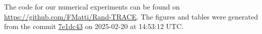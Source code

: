The code for our numerical experiments can be found on \url{https://github.com/FMatti/Rand-TRACE}. The figures and tables were generated from the commit \href{https://github.com/FMatti/Rand-TRACE/tree/7e1dc43}{7e1dc43} on 2025-02-20 at 14:53:12 UTC.
